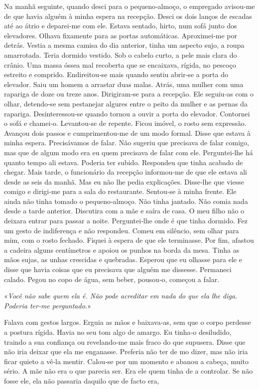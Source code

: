 Na manhã seguinte, quando desci para o pequeno­‑almoço, o empregado
avisou­‑me de que havia alguém à minha espera na recepção. Desci os dois
lanços de escadas até ao átrio e deparei­‑me com ele. Estava sentado,
hirto, num sofá junto dos elevadores. Olhava fixamente para as portas
automáticas. Aproximei­‑me por detrás. Vestia a mesma camisa do dia
anterior, tinha um aspecto sujo, a roupa amarrotada. Teria dormido
vestido. Sob o cabelo curto, a pele mais clara do crânio. Uma massa
óssea mal recoberta que se encaixava, rígida, no pescoço estreito e
comprido. Endireitou­‑se mais quando sentiu abrir­‑se a porta do
elevador. Saiu um homem a arrastar duas malas. Atrás, uma mulher com uma
rapariga de doze ou treze anos. Dirigiram­‑se para a recepção. Ele
seguiu­‑as com o olhar, detendo­‑se sem pestanejar algures entre o peito
da mulher e as pernas da rapariga. Desinteressou­‑se quando tornou a
ouvir a porta do elevador. Contornei o sofá e chamei­‑o. Levantou­‑se de
repente. Ficou imóvel, o rosto sem expressão. Avançou dois passos e
cumprimentou­‑me de um modo formal. Disse que estava à minha espera.
Precisávamos de falar. Não sugeriu que precisava de falar comigo, mas
que de algum modo era eu quem precisava de falar com ele. Perguntei­‑lhe
há quanto tempo ali estava. Poderia ter subido. Respondeu que tinha
acabado de chegar. Mais tarde, o funcionário da recepção informou­‑me de
que ele estava ali desde as seis da manhã. Mas eu não lhe pedia
explicações. Disse­‑lhe que viesse comigo e dirigi­‑me para a sala do
restaurante. Sentou­‑se à minha frente. Ele ainda não tinha tomado o
pequeno­‑almoço. Não tinha jantado. Não comia nada desde a tarde
anterior. Discutira com a mãe e saíra de casa. O meu filho não o deixara
entrar para passar a noite. Perguntei­‑lhe onde é que tinha dormido. Fez
um gesto de indiferença e não respondeu. Comeu em silêncio, sem olhar
para mim, com o rosto fechado. Fiquei à espera de que ele terminasse.
Por fim, afastou a cadeira alguns centímetros e apoiou os punhos na
borda da mesa. Tinha as mãos sujas, as unhas crescidas e quebradas.
Esperou que eu olhasse para ele e disse que havia coisas que eu
precisava que alguém me dissesse. Permaneci calado. Pegou no copo de
água, sem beber, pousou­‑o, começou a falar.

«\emph{Você não sabe quem ela é. Não pode acreditar em nada do que ela
lhe diga. Poderia ter­‑me perguntado.}»

Falava com gestos largos. Erguia as mãos e baixava­‑as, sem que o corpo
perdesse a postura rígida. Havia no seu tom algo de amargo. Eu tinha­‑o
desiludido, traindo a sua confiança ou revelando­‑me mais fraco do que
supusera. Disse que não iria deixar que ela me enganasse. Preferia não
ter de mo dizer, mas não iria ficar quieto a vê­‑la mentir. Calou­‑se
por um momento e abanou a cabeça, muito sério. A mãe não era o que
parecia ser. Era ele quem tinha de a controlar. Se não fosse ele, ela
não passaria daquilo que de facto era,

